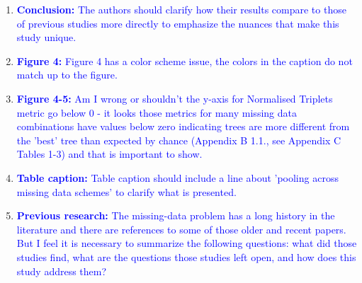 \documentclass[12pt,letterpaper]{article}
\begin{document}
\begin{enumerate}
\item{\textcolor{blue}{\textbf{Conclusion:} The authors should clarify how their results compare to those of previous studies more directly to emphasize the nuances that make this study unique. }}

\item{\textcolor{blue}{\textbf{Figure 4:} Figure 4 has a color scheme issue, the colors in the caption do not match up to the figure.}}


\item{\textcolor{blue}{\textbf{Figure 4-5:} Am I wrong or shouldn't the y-axis for Normalised Triplets metric go below 0 - it looks those metrics for many missing data combinations have values below zero indicating trees are more different from the 'best' tree than expected by chance (Appendix B 1.1., see Appendix C Tables 1-3) and that is important to show.}}

\item{\textcolor{blue}{\textbf{Table caption:} Table caption should include a line about 'pooling across missing data schemes' to clarify what is presented.}}

\item{\textcolor{blue}{\textbf{Previous research:} The missing-data problem has a long history in the literature and there are references to some of those older and recent papers.
But I feel it is necessary to summarize the following questions: what did those studies find, what are the questions those studies left open, and how does this study address them?}}
\end{enumerate}
\end{document}
